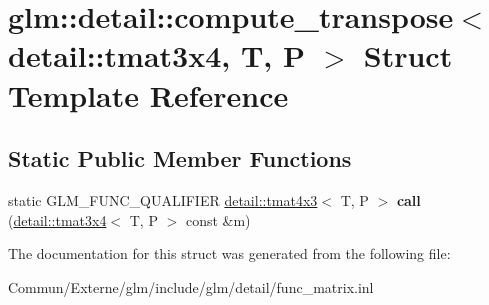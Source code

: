 \hypertarget{structglm_1_1detail_1_1compute__transpose_3_01detail_1_1tmat3x4_00_01_t_00_01_p_01_4}{}\section{glm\+:\+:detail\+:\+:compute\+\_\+transpose$<$ detail\+:\+:tmat3x4, T, P $>$ Struct Template Reference}
\label{structglm_1_1detail_1_1compute__transpose_3_01detail_1_1tmat3x4_00_01_t_00_01_p_01_4}
\subsection*{Static Public Member Functions}
\begin{DoxyCompactItemize}
\item 
static G\+L\+M\+\_\+\+F\+U\+N\+C\+\_\+\+Q\+U\+A\+L\+I\+F\+I\+ER \hyperlink{structglm_1_1detail_1_1tmat4x3}{detail\+::tmat4x3}$<$ T, P $>$ {\bfseries call} (\hyperlink{structglm_1_1detail_1_1tmat3x4}{detail\+::tmat3x4}$<$ T, P $>$ const \&m)\hypertarget{structglm_1_1detail_1_1compute__transpose_3_01detail_1_1tmat3x4_00_01_t_00_01_p_01_4_a1cd1f07ec6c02b790e15ae86c40fb5b0}{}\label{structglm_1_1detail_1_1compute__transpose_3_01detail_1_1tmat3x4_00_01_t_00_01_p_01_4_a1cd1f07ec6c02b790e15ae86c40fb5b0}

\end{DoxyCompactItemize}


The documentation for this struct was generated from the following file\+:\begin{DoxyCompactItemize}
\item 
Commun/\+Externe/glm/include/glm/detail/func\+\_\+matrix.\+inl\end{DoxyCompactItemize}
